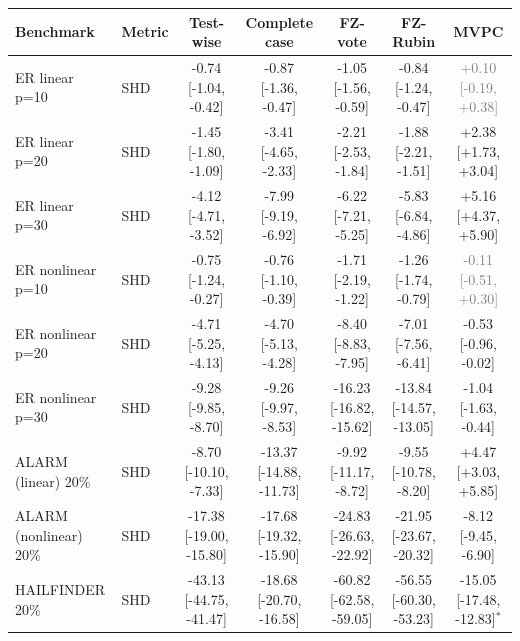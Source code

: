 \begin{tabular}{llccccc}
    \toprule
    Benchmark & Metric & Test-wise & Complete case & FZ-vote & FZ-Rubin & MVPC \\
    \midrule
    ER linear p=10             & SHD & -0.74 [-1.04, -0.42] & -0.87 [-1.36, -0.47] & -1.05 [-1.56, -0.59] & -0.84 [-1.24, -0.47] & \textcolor{gray}{+0.10 [-0.19, +0.38]} \\
    \midrule
    ER linear p=20             & SHD & -1.45 [-1.80, -1.09] & -3.41 [-4.65, -2.33] & -2.21 [-2.53, -1.84] & -1.88 [-2.21, -1.51] & +2.38 [+1.73, +3.04] \\
    \midrule
    ER linear p=30             & SHD & -4.12 [-4.71, -3.52] & -7.99 [-9.19, -6.92] & -6.22 [-7.21, -5.25] & -5.83 [-6.84, -4.86] & +5.16 [+4.37, +5.90] \\
    \midrule
    ER nonlinear p=10          & SHD & -0.75 [-1.24, -0.27] & -0.76 [-1.10, -0.39] & -1.71 [-2.19, -1.22] & -1.26 [-1.74, -0.79] & \textcolor{gray}{-0.11 [-0.51, +0.30]} \\
    \midrule
    ER nonlinear p=20          & SHD & -4.71 [-5.25, -4.13] & -4.70 [-5.13, -4.28] & -8.40 [-8.83, -7.95] & -7.01 [-7.56, -6.41] & -0.53 [-0.96, -0.02] \\
    \midrule
    ER nonlinear p=30          & SHD & -9.28 [-9.85, -8.70] & -9.26 [-9.97, -8.53] & -16.23 [-16.82, -15.62] & -13.84 [-14.57, -13.05] & -1.04 [-1.63, -0.44] \\
    \midrule
    ALARM (linear) 20\%        & SHD & -8.70 [-10.10, -7.33] & -13.37 [-14.88, -11.73] & -9.92 [-11.17, -8.72] & -9.55 [-10.78, -8.20] & +4.47 [+3.03, +5.85] \\
    \midrule
    ALARM (nonlinear) 20\%     & SHD & -17.38 [-19.00, -15.80] & -17.68 [-19.32, -15.90] & -24.83 [-26.63, -22.92] & -21.95 [-23.67, -20.32] & -8.12 [-9.45, -6.90] \\
    \midrule
    HAILFINDER 20\%            & SHD & -43.13 [-44.75, -41.47] & -18.68 [-20.70, -16.58] & -60.82 [-62.58, -59.05] & -56.55 [-60.30, -53.23] & -15.05 [-17.48, -12.83]$^\ast$ \\
    \bottomrule
\end{tabular}
